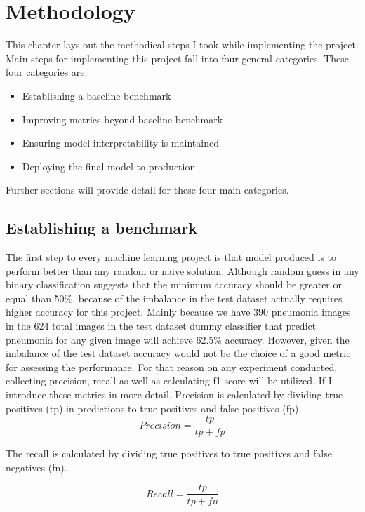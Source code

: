 \chapter{Methodology} \label{chap:methodology}
This chapter lays out the methodical steps I took while implementing the project.
Main steps for implementing this project fall into four general categories.
These four categories are:
\begin{itemize}
    \item Establishing a baseline benchmark
    \item Improving metrics beyond baseline benchmark
    \item Ensuring model interpretability is maintained
    \item Deploying the final model to production
\end{itemize}

Further sections will provide detail for these four main categories.

\section{Establishing a benchmark}
The first step to every machine learning project is that model produced is to perform better than any random or naive solution.
Although random guess in any binary classification suggests that the minimum accuracy should be greater or equal than 50\%, because of the imbalance in the test dataset actually requires higher accuracy for this project.
Mainly because we have 390 pneumonia images in the 624 total images in the test dataset dummy classifier that predict pneumonia for any given image will achieve 62.5\% accuracy.
However, given the imbalance of the test dataset accuracy would not be the choice of a good metric for assessing the performance.
For that reason on any experiment conducted, collecting precision, recall as well as calculating f1 score will be utilized.
If I introduce these metrics in more detail.
Precision is calculated by dividing true positives (tp) in predictions to true positives and false positives (fp).
\begin{equation}
    Precision = \frac{tp}{tp + fp}
\end{equation}

The recall is calculated by dividing true positives to true positives and false negatives (fn).

\begin{equation}
    Recall = \frac{tp}{tp + fn}
\end{equation}

